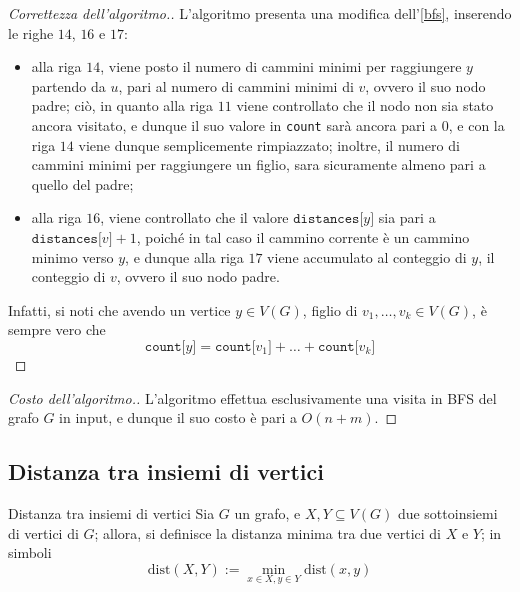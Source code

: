 \documentclass[a4paper, 12pt]{report}
\begin{document}
    \begin{proof}[Correttezza dell'algoritmo.]
        L'algoritmo presenta una modifica dell'\cref{bfs}, inserendo le righe $14$, $16$ e $17$:

        \begin{itemize}
            \item alla riga $14$, viene posto il numero di cammini minimi per raggiungere $y$ partendo da $u$, pari al numero di cammini minimi di $v$, ovvero il suo nodo padre; ciò, in quanto alla riga $11$ viene controllato che il nodo non sia stato ancora visitato, e dunque il suo valore in \texttt{count} sarà ancora pari a $0$, e con la riga $14$ viene dunque semplicemente rimpiazzato; inoltre, il numero di cammini minimi per raggiungere un figlio, sara sicuramente almeno pari a quello del padre;
            \item alla riga $16$, viene controllato che il valore $\texttt{distances[}y\texttt{]}$ sia pari a $\texttt{distances[}v\texttt{]} + 1$, poiché in tal caso il cammino corrente è un cammino minimo verso $y$, e dunque alla riga $17$ viene accumulato al conteggio di $y$, il conteggio di $v$, ovvero il suo nodo padre.
        \end{itemize}

        Infatti, si noti che avendo un vertice $y \in V(G)$, figlio di $v_1, \ldots, v_k \in V(G)$, è sempre vero che $$\texttt{count[}y\texttt{]} = \texttt{count[}v_1\texttt{]} + \ldots + \texttt{count[}v_k\texttt{]}$$
    \end{proof}

    \begin{proof}[Costo dell'algoritmo.]
        L'algoritmo effettua esclusivamente una visita in BFS del grafo $G$ in input, e dunque il suo costo è pari a $O(n+m)$.
    \end{proof}

    \subsection{Distanza tra insiemi di vertici}

    \begin{frameddefn}{Distanza tra insiemi di vertici}
        Sia $G$ un grafo, e $X, Y \subseteq V(G)$ due sottoinsiemi di vertici di $G$; allora, si definisce  la distanza minima tra due vertici di $X$ e $Y$; in simboli $$\mathrm{dist}(X, Y) := \min_{x \in X, y \in Y}{\mathrm{dist}(x, y)}$$
    \end{frameddefn}
\end{document}

